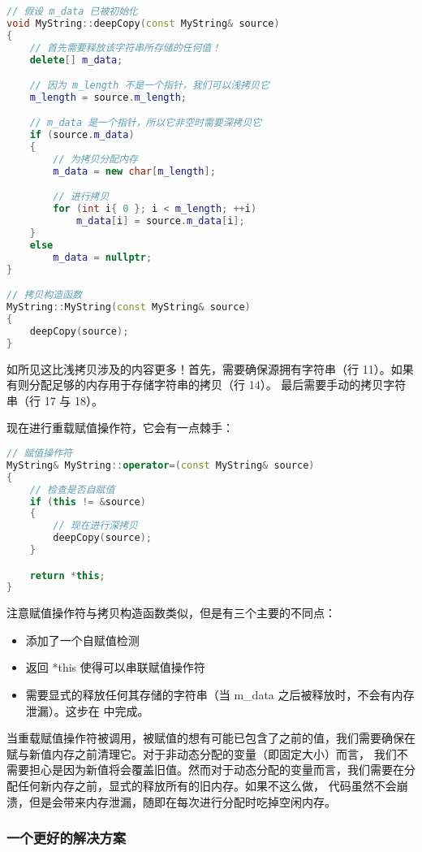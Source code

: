 \documentclass[../../LearnCpp.tex]{subfiles}
\begin{document}
\begin{lstlisting}[language=C++]
// 假设 m_data 已被初始化
void MyString::deepCopy(const MyString& source)
{
    // 首先需要释放该字符串所存储的任何值！
    delete[] m_data;

    // 因为 m_length 不是一个指针，我们可以浅拷贝它
    m_length = source.m_length;

    // m_data 是一个指针，所以它非空时需要深拷贝它
    if (source.m_data)
    {
        // 为拷贝分配内存
        m_data = new char[m_length];

        // 进行拷贝
        for (int i{ 0 }; i < m_length; ++i)
            m_data[i] = source.m_data[i];
    }
    else
        m_data = nullptr;
}

// 拷贝构造函数
MyString::MyString(const MyString& source)
{
    deepCopy(source);
}
\end{lstlisting}

如所见这比浅拷贝涉及的内容更多！首先，需要确保源拥有字符串（行 11）。如果有则分配足够的内存用于存储字符串的拷贝（行 14）。
最后需要手动的拷贝字符串（行 17 与 18）。

现在进行重载赋值操作符，它会有一点棘手：

\begin{lstlisting}[language=C++]
// 赋值操作符
MyString& MyString::operator=(const MyString& source)
{
    // 检查是否自赋值
    if (this != &source)
    {
        // 现在进行深拷贝
        deepCopy(source);
    }

    return *this;
}
\end{lstlisting}

注意赋值操作符与拷贝构造函数类似，但是有三个主要的不同点：

\begin{itemize}
    \item 添加了一个自赋值检测
    \item 返回 *this 使得可以串联赋值操作符
    \item 需要显式的释放任何其存储的字符串（当 m\_data 之后被释放时，不会有内存泄漏）。这步在  中完成。
\end{itemize}

当重载赋值操作符被调用，被赋值的想有可能已包含了之前的值，我们需要确保在赋与新值内存之前清理它。对于非动态分配的变量（即固定大小）而言，
我们不需要担心是因为新值将会覆盖旧值。然而对于动态分配的变量而言，我们需要在分配任何新内存之前，显式的释放所有的旧内存。如果不这么做，
代码虽然不会崩溃，但是会带来内存泄漏，随即在每次进行分配时吃掉空闲内存。

\subsubsection*{一个更好的解决方案}
\end{document}
